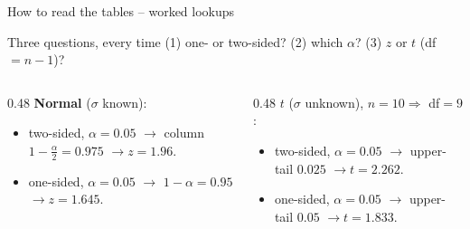 \documentclass[aspectratio=169,11pt]{beamer}
\begin{document}
\begin{frame}{How to read the tables -- worked lookups}
  \begin{block}{Three questions, every time}
    (1) one- or two-sided? \quad (2) which $\alpha$? \quad (3) $z$ or $t$ (df $=n-1$)?
  \end{block}
  \begin{columns}[T]
    \begin{column}{0.48\textwidth}
      \textbf{Normal} ($\sigma$ known):
      \begin{itemize}\footnotesize\setlength{\itemsep}{2pt}
        \item two-sided, $\alpha=0.05$ $\to$ column $1-\tfrac{\alpha}{2}=0.975$
              $\to z=1.96$.
        \item one-sided, $\alpha=0.05$ $\to$ $1-\alpha=0.95$ $\to z=1.645$.
      \end{itemize}
    \end{column}
    \begin{column}{0.48\textwidth}
      {\boldmath\textbf{$t$}} ($\sigma$ unknown), $n=10\Rightarrow$ df$=9$:
      \begin{itemize}\footnotesize\setlength{\itemsep}{2pt}
        \item two-sided, $\alpha=0.05$ $\to$ upper-tail $0.025$ $\to t=2.262$.
        \item one-sided, $\alpha=0.05$ $\to$ upper-tail $0.05$ $\to t=1.833$.
      \end{itemize}
    \end{column}
  \end{columns}
\end{frame}
\end{document}
